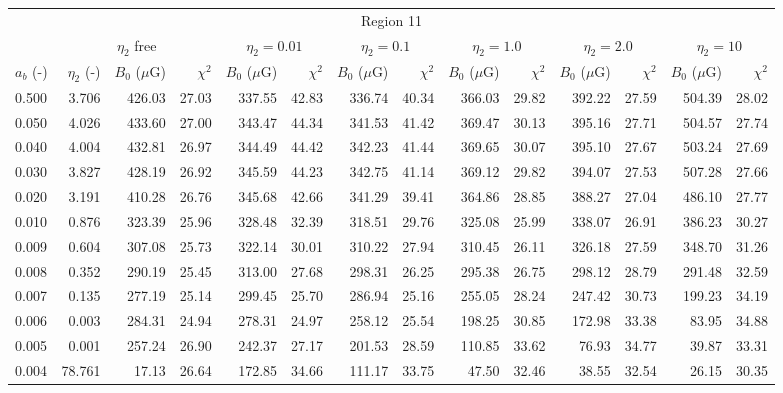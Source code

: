 \begin{tabular}{@{}lrrrrrrrrrrrrr@{}}
\toprule
\multicolumn{14}{c}{Region 11} \\
\cmidrule{1-14}
{} & \multicolumn{3}{c}{$\eta_2$ free} & \multicolumn{2}{c}{$\eta_2 = 0.01$}
   & \multicolumn{2}{c}{$\eta_2 = 0.1$} & \multicolumn{2}{c}{$\eta_2 = 1.0$}
   & \multicolumn{2}{c}{$\eta_2 = 2.0$} & \multicolumn{2}{c}{$\eta_2 = 10$} \\
\cmidrule(lr){2-4} \cmidrule(lr){5-6} \cmidrule(lr){7-8} \cmidrule(lr){9-10}
    \cmidrule(lr){11-12} \cmidrule(lr){13-14}
$a_b$ (-) & $\eta_2$ (-) & $B_0$ ($\mu$G) & $\chi^2$
& $B_0$ ($\mu$G) & $\chi^2$ & $B_0$ ($\mu$G) & $\chi^2$
& $B_0$ ($\mu$G) & $\chi^2$ & $B_0$ ($\mu$G) & $\chi^2$
& $B_0$ ($\mu$G) & $\chi^2$ \\
\cmidrule{1-14}
0.500 & 3.706 & 426.03 & 27.03 & 337.55 & 42.83 & 336.74 & 40.34 & 366.03 & 29.82 & 392.22 & 27.59 & 504.39 & 28.02 \\
0.050 & 4.026 & 433.60 & 27.00 & 343.47 & 44.34 & 341.53 & 41.42 & 369.47 & 30.13 & 395.16 & 27.71 & 504.57 & 27.74 \\
0.040 & 4.004 & 432.81 & 26.97 & 344.49 & 44.42 & 342.23 & 41.44 & 369.65 & 30.07 & 395.10 & 27.67 & 503.24 & 27.69 \\
0.030 & 3.827 & 428.19 & 26.92 & 345.59 & 44.23 & 342.75 & 41.14 & 369.12 & 29.82 & 394.07 & 27.53 & 507.28 & 27.66 \\
0.020 & 3.191 & 410.28 & 26.76 & 345.68 & 42.66 & 341.29 & 39.41 & 364.86 & 28.85 & 388.27 & 27.04 & 486.10 & 27.77 \\
0.010 & 0.876 & 323.39 & 25.96 & 328.48 & 32.39 & 318.51 & 29.76 & 325.08 & 25.99 & 338.07 & 26.91 & 386.23 & 30.27 \\
0.009 & 0.604 & 307.08 & 25.73 & 322.14 & 30.01 & 310.22 & 27.94 & 310.45 & 26.11 & 326.18 & 27.59 & 348.70 & 31.26 \\
0.008 & 0.352 & 290.19 & 25.45 & 313.00 & 27.68 & 298.31 & 26.25 & 295.38 & 26.75 & 298.12 & 28.79 & 291.48 & 32.59 \\
0.007 & 0.135 & 277.19 & 25.14 & 299.45 & 25.70 & 286.94 & 25.16 & 255.05 & 28.24 & 247.42 & 30.73 & 199.23 & 34.19 \\
0.006 & 0.003 & 284.31 & 24.94 & 278.31 & 24.97 & 258.12 & 25.54 & 198.25 & 30.85 & 172.98 & 33.38 & 83.95 & 34.88 \\
0.005 & 0.001 & 257.24 & 26.90 & 242.37 & 27.17 & 201.53 & 28.59 & 110.85 & 33.62 & 76.93 & 34.77 & 39.87 & 33.31 \\
0.004 & 78.761 & 17.13 & 26.64 & 172.85 & 34.66 & 111.17 & 33.75 & 47.50 & 32.46 & 38.55 & 32.54 & 26.15 & 30.35 \\


\end{tabular}
